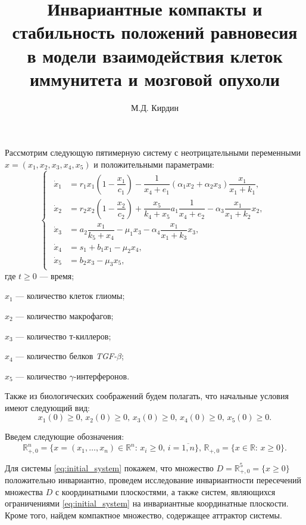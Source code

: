 \documentclass[12pt,a4paper]{extarticle}
\title{Инвариантные компакты и стабильность положений равновесия в модели взаимодействия клеток иммунитета и мозговой опухоли}
\author{М.Д. Кирдин}
\theoremstyle{definition}
\theoremstyle{definition}
\theoremstyle{definition}
\begin{document}
	Рассмотрим следующую пятимерную систему с неотрицательными переменными $x=(x_1, x_2, x_3, x_4, x_5)$ и положительными параметрами:
	\begin{equation}
		\begin{cases}
			\begin{aligned}
				\dot{x}_1 &= r_1x_1\left(1-\dfrac{x_1}{c_1}\right)-\dfrac{1}{x_4+e_1}(\alpha_1x_2+\alpha_2x_3)\dfrac{x_1}{x_1+k_1},\\
				\dot{x}_2 &= r_2x_2\left(1-\dfrac{x_2}{c_2}\right)+\dfrac{x_5}{k_4+x_5}a_1\dfrac{1}{x_4+e_2}-\alpha_3\dfrac{x_1}{x_1+k_2}x_2,\\
				\dot{x}_3 &= a_2\dfrac{x_1}{k_5+x_4}-\mu_1x_3-\alpha_4\dfrac{x_1}{x_1+k_3}x_3,\\
				\dot{x}_4 &= s_1 + b_1x_1-\mu_2x_4,\\
				\dot{x}_5 &= b_2x_3-\mu_3x_5,
			\end{aligned}
		\end{cases}\label{eq:initial_system}
	\end{equation}
	где $t\ge0$ --- время;
	
	$x_1$ --- количество клеток глиомы;
	
	$x_2$ --- количество макрофагов;
	
	$x_3$ --- количество т-киллеров;
	
	$x_4$ --- количество белков \textit{TGF-}$\beta$;
	
	$x_5$ --- количество $\gamma$-интерферонов. 
	
	Также из биологических соображений будем полагать, что начальные условия имеют следующий вид:
	\begin{equation}\label{eq:conds}
		x_1(0)\ge0,\,x_2(0)\ge0,\,x_3(0)\ge0,\,x_4(0)\ge0,\,x_5(0)\ge0.
	\end{equation}
	
	Введем следующие обозначения:
	\[\mathbb{R}^n_{+,0}=\{x=(x_1,\dots,x_n)\in\mathbb{R}^n:\, x_i\ge0,\, i=\overline{1,n}\},\,\mathbb{R}_{+,0}=\{x\in\mathbb{R}:\, x\ge0\}.\]
	
	Для системы \ref{eq:initial_system} покажем, что множество $D=\mathbb{R}^{5}_{+,0} = \{x \ge 0\}$ положительно инвариантно, проведем исследование инвариантности пересечений множества $D$ с координатными плоскостями, а также систем, являющихся ограничениями \ref{eq:initial_system} на инвариантные координатные плоскости. Кроме того, найдем компактное множество, содержащее аттрактор системы.
	
\end{document}
